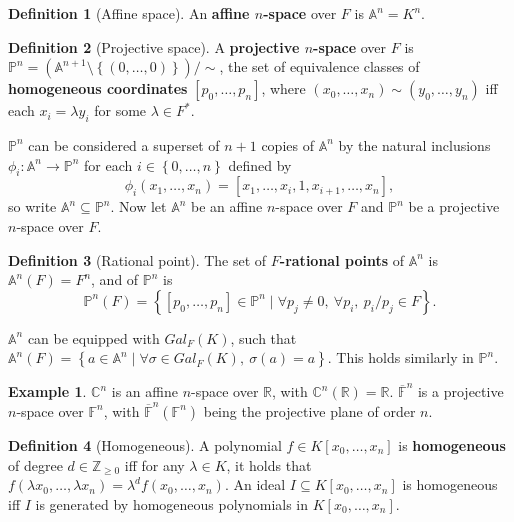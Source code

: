 \documentclass{article}
\newcommand{\F}{\mathbb{F}}
\newcommand{\Z}{\mathbb{Z}}
\newcommand{\R}{\mathbb{R}}
\newcommand{\C}{\mathbb{C}}
\newcommand{\A}{\mathbb{A}}
\renewcommand{\P}{\mathbb{P}}
\newcommand{\rb}[1]{\left( #1 \right)}
\renewcommand{\sb}[1]{\left[ #1 \right]}
\newcommand{\cb}[1]{\left\{ #1 \right\}}
\theoremstyle{definition}\newtheorem*{definition}{Definition}
\theoremstyle{definition}\newtheorem*{example}{Example}
\theoremstyle{definition}\newtheorem*{remark}{Remark}
\begin{document}
\begin{definition}[Affine space]
An \textbf{affine $ n $-space} over $ F $ is $ \A^n = K^n $.
\end{definition}

\begin{definition}[Projective space]
A \textbf{projective $ n $-space} over $ F $ is $ \P^n = \rb{\A^{n + 1} \setminus \cb{\rb{0, \dots, 0}}} / \sim $, the set of equivalence classes of \textbf{homogeneous coordinates} $ \sb{p_0, \dots, p_n} $, where $ \rb{x_0, \dots, x_n} \sim \rb{y_0, \dots, y_n} $ iff each $ x_i = \lambda y_i $ for some $ \lambda \in F^* $.
\end{definition}

$ \P^n $ can be considered a superset of $ n + 1 $ copies of $ \A^n $ by the natural inclusions $ \phi_i : \A^n \to \P^n $ for each $ i \in \cb{0, \dots, n} $ defined by
$$ \phi_i\rb{x_1, \dots, x_n} = \sb{x_1, \dots, x_i, 1, x_{i + 1}, \dots, x_n}, $$
so write $ \A^n \subseteq \P^n $. Now let $ \A^n $ be an affine $ n $-space over $ F $ and $ \P^n $ be a projective $ n $-space over $ F $.

\begin{definition}[Rational point]
The set of \textbf{$ F $-rational points} of $ \A^n $ is $ \A^n\rb{F} = F^n $, and of $ \P^n $ is
$$ \P^n\rb{F} = \cb{\sb{p_0, \dots, p_n} \in \P^n \mid \forall p_j \ne 0, \ \forall p_i, \ p_i / p_j \in F}. $$
\end{definition}

$ \A^n $ can be equipped with $ Gal_F\rb{K} $, such that $ \A^n\rb{F} = \cb{a \in \A^n \mid \forall \sigma \in Gal_F\rb{K}, \ \sigma\rb{a} = a} $. This holds similarly in $ \P^n $.

\begin{example}
$ \C^n $ is an affine $ n $-space over $ \R $, with $ \C^n\rb{\R} = \R $. $ \overline{\F}^n $ is a projective $ n $-space over $ \F^n $, with $ \overline{\F}^n\rb{\F^n} $ being the projective plane of order $ n $.
\end{example}

\begin{definition}[Homogeneous]
A polynomial $ f \in K\sb{x_0, \dots, x_n} $ is \textbf{homogeneous} of degree $ d \in \Z_{\ge 0} $ iff for any $ \lambda \in K $, it holds that $ f\rb{\lambda x_0, \dots, \lambda x_n} = \lambda^d f\rb{x_0, \dots, x_n} $. An ideal $ I \subseteq K\sb{x_0, \dots, x_n} $ is homogeneous iff $ I $ is generated by homogeneous polynomials in $ K\sb{x_0, \dots, x_n} $.
\end{definition}
\end{document}
